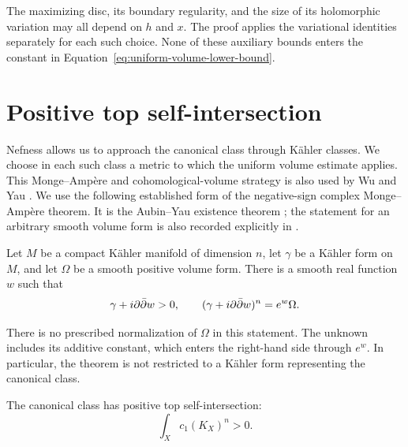 The maximizing disc, its boundary regularity, and the size of its
holomorphic variation may all depend on $h$ and $x$.  The proof applies
the variational identities separately for each such choice.  None of
these auxiliary bounds enters the constant in
Equation~\eqref{eq:uniform-volume-lower-bound}.

\section{Positive top self-intersection}
\label{sec:positive-intersection}

Nefness allows us to approach the canonical class through K\"ahler
classes. We choose in each such class a metric to which the uniform
volume estimate applies. This Monge--Amp\`ere and cohomological-volume
strategy is also used by Wu and Yau
\cite[Proposition~8(i) and the proof of Lemma~6 in the authors' preprint]{WuYau2016}.
We use the following established form of the negative-sign complex
Monge--Amp\`ere theorem.  It is the Aubin--Yau existence theorem
\cite{Aubin1998,Yau1978}; the statement for an arbitrary smooth volume form is
also recorded explicitly in \cite[\S1, Equation~(1.1)]{Berman2019}.

\begin{theorem}
\label{thm:negative-cma}
Let $M$ be a compact K\"ahler manifold of dimension $n$, let $\gamma$
be a K\"ahler form on $M$, and let $\Omega$ be a smooth positive volume
form.  There is a smooth real function $w$ such that
\[
 \gamma+i\partial\bar\partial w>0,
 \qquad
 (\gamma+i\partial\bar\partial w)^n=e^w\Omega.
\]
\end{theorem}

There is no prescribed normalization of $\Omega$ in this statement.
The unknown includes its additive constant, which enters the
right-hand side through $e^w$.  In particular, the theorem is not
restricted to a K\"ahler form representing the canonical class.

\begin{proposition}
\label{prop:positive-top-intersection}
The canonical class has positive top self-intersection:
\[
 \int_X c_1(K_X)^n>0.
\]
\end{proposition}

